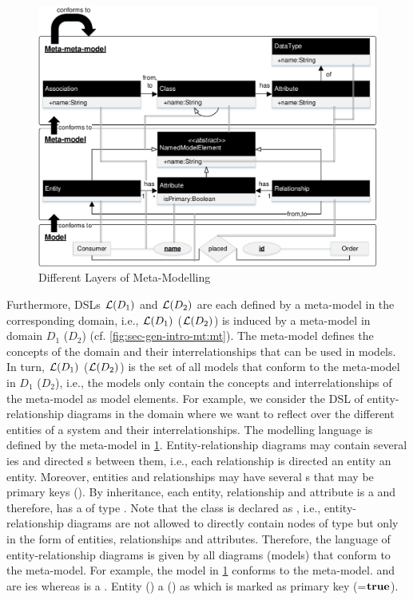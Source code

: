 \begin{figure}[!tb]
\begin{center}
\includegraphics[width=.95\textwidth]{img/gen_intro/meta.pdf}
\end{center}
\caption{Different Layers of Meta-Modelling}
\label{fig:sec-gen-intro-mt:meta}
\end{figure}

Furthermore, DSLs $\mathcal{L}(D_1)$ and $\mathcal{L}(D_2)$ are each defined by a meta-model in the corresponding domain, i.e., $\mathcal{L}(D_1)$ ($\mathcal{L}(D_2)$) is induced by a meta-model in domain $D_1$ ($D_2$) (cf. \cref{fig:sec-gen-intro-mt:mt}).
The meta-model defines the concepts of the domain and their interrelationships that can be used in models.
In turn, $\mathcal{L}(D_1)$ ($\mathcal{L}(D_2)$) is the set of all models that conform to the meta-model in $D_1$ ($D_2$), i.e., the models only contain the concepts and interrelationships of the meta-model as model elements.
For example, we consider the DSL of entity-relationship diagrams in the domain where we want to reflect over the different entities of a system and their interrelationships.
The modelling language is defined by the meta-model in \cref{fig:sec-gen-intro-mt:meta}.
Entity-relationship diagrams may contain several ies and directed s between them, i.e., each relationship is directed  an entity  an entity.  
Moreover, entities and relationships may have several s that may be primary keys ().
By inheritance, each entity, relationship and attribute is a  and therefore, has a  of type .
Note that the class  is declared as , i.e., entity-relationship diagrams are not allowed to directly contain nodes of type  but only in the form of entities, relationships and attributes.
Therefore, the language of entity-relationship diagrams is given by all diagrams (models) that conform to the meta-model.
For example, the model in \cref{fig:sec-gen-intro-mt:meta} conforms to the meta-model.
 and  are ies whereas  is a     .
Entity  ()  a  () as  which is marked as primary key (=$\textbf{true}$).

